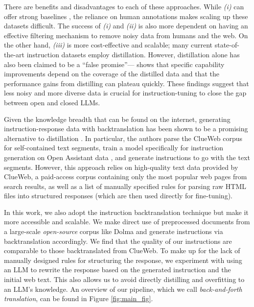 There are benefits and disadvantages to each of these approaches. While \textit{(i)} can offer strong baselines \cite{zhou2024lima, kopf2024openassistant}, the reliance on human annotations makes scaling up these datasets difficult. %
The success of \textit{(i)} and \textit{(ii)} is also more dependent on having an effective filtering mechanism to remove noisy data from humans and the web. On the other hand, \textit{(iii)} is more cost-effective and scalable; many current state-of-the-art instruction datasets employ distillation. However, distillation alone has also been claimed to be a ``false promise''---\citet{gudibande2023false} shows that specific capability improvements depend on the coverage of the distilled data and that the performance gains from distilling can plateau quickly. These findings suggest that less noisy and more diverse data is crucial for instruction-tuning to close the gap between open and closed LLMs.

Given the knowledge breadth that can be found on the internet, generating instruction-response data with backtranslation has been shown to be a promising alternative to distillation \cite{li2023self}. In particular, the authors parse the ClueWeb corpus \cite{overwijk2022clueweb22} for self-contained text segments, train a model specifically for instruction generation on Open Assistant data \cite{kopf2024openassistant}, and generate instructions to go with the text segments. However, this approach relies on high-quality text data provided by ClueWeb, a paid-access corpus containing only the most popular web pages from search results, as well as a list of manually specified rules for parsing raw HTML files into structured responses (which are then used directly for fine-tuning). %

In this work, we also adopt the instruction backtranslation technique but make it more accessible and scalable. We make direct use of preprocessed documents from a large-scale \textit{open-source} corpus like Dolma \cite{dolma} and generate instructions via backtranslation accordingly. We find that the quality of our instructions are comparable to those backtranslated from ClueWeb. To make up for the lack of manually designed rules for structuring the response, we experiment with using an LLM to rewrite the response based on the generated instruction and the initial web text. This also allows us to avoid directly distilling and overfitting to an LLM's knowledge. An overview of our pipeline, which we call \emph{back-and-forth translation}, can be found in Figure \ref{fig:main_fig}. %

